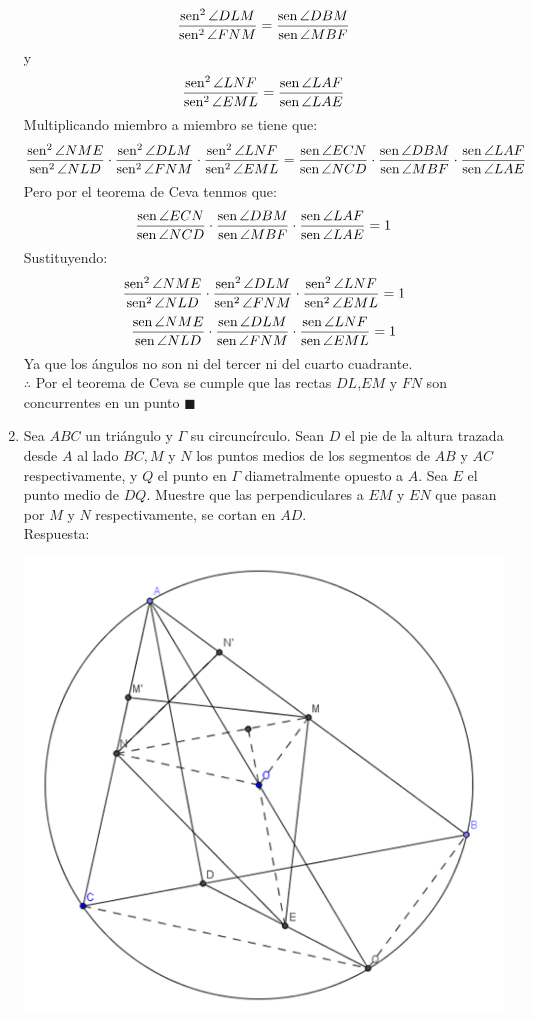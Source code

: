 \documentclass{book}
\newcommand{\sen}{\mathop{\rm sen}\nolimits} %
\begin{document}
\begin{enumerate}
$${\sen^2  {\angle DLM}\over\sen^2  {\angle FNM}}={\sen {\angle DBM}\over\sen {\angle MBF}}$$
y
$${\sen^2  {\angle LNF}\over\sen^2  {\angle EML}}={\sen {\angle LAF}\over\sen {\angle LAE}}$$
Multiplicando miembro a miembro se tiene que:
$${\sen^2  {\angle NME}\over\sen^2  {\angle NLD}}\cdot{\sen^2  {\angle DLM}\over\sen^2  {\angle FNM}}\cdot{\sen^2  {\angle LNF}\over\sen^2  {\angle EML}}={\sen {\angle ECN}\over\sen {\angle NCD}}\cdot{\sen {\angle DBM}\over\sen {\angle MBF}}\cdot{\sen {\angle LAF}\over\sen {\angle LAE}}$$
Pero por el teorema de Ceva tenmos que:
$${\sen {\angle ECN}\over\sen {\angle NCD}}\cdot{\sen {\angle DBM}\over\sen {\angle MBF}}\cdot{\sen {\angle LAF}\over\sen {\angle LAE}}=1$$
Sustituyendo:
$${\sen^2  {\angle NME}\over\sen^2  {\angle NLD}}\cdot{\sen^2  {\angle DLM}\over\sen^2  {\angle FNM}}\cdot{\sen^2  {\angle LNF}\over\sen^2  {\angle EML}}=1$$
$${\sen  {\angle NME}\over\sen  {\angle NLD}}\cdot{\sen  {\angle DLM}\over\sen  {\angle FNM}}\cdot{\sen  {\angle LNF}\over\sen  {\angle EML}}=1$$
Ya que los ángulos no son ni del tercer ni del cuarto cuadrante.\\
$\therefore$ Por el teorema de Ceva se cumple que las rectas $DL$,$EM$ y $FN$ son concurrentes en un punto $\blacksquare$\\
				\item Sea $ABC$ un triángulo y $\Gamma$ su circuncírculo. Sean $D$ el pie de la altura trazada desde $A$ al lado $BC, M$ y $N$ los puntos medios de los segmentos de $AB$ y $AC$ respectivamente, y $Q$ el punto en $\Gamma$ diametralmente opuesto a $A$. Sea $E$ el punto medio de $DQ$. Muestre que las perpendiculares a $EM$ y $EN$ que pasan por $M$ y $N$ respectivamente, se cortan en $AD$.  \\
					Respuesta:
					\begin{center}
						\includegraphics[scale=1]{imagenes/Geometria/19.png}

\end{center}
\end{enumerate}
\end{document}
